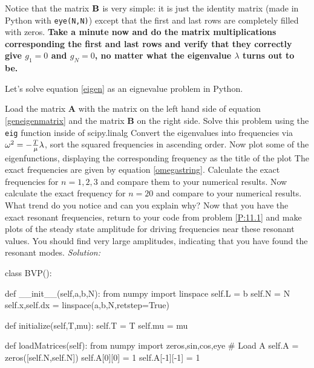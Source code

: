 \normalsize Notice that the matrix $\bf B$ is very simple: it is just
the identity matrix (made in Python with {\tt eye(N,N)}) except that
the first and last rows are completely filled with zeros. \textbf{Take a
minute now and do the matrix multiplications corresponding the first
and last rows and verify that they correctly give $g_1=0$ and
$g_N=0$, no matter what the eigenvalue $\lambda$ turns out to be.}

\begin{enumerate}
\probtwo  \label{P:11.2} Let's solve equation \eqref{eigen} as an eignevalue problem
in Python.  
\begin{enumerate}
\subprob  Load the matrix $\mathbf{A}$ with the matrix on the left hand
side of equation \eqref{geneigenmatrix} and the matrix $\mathbf{B}$ on
the right side.
\subprob  Solve this problem using the \texttt{eig} function inside of
scipy.linalg
\subprob Convert the eigenvalues into frequencies via $\omega^2 = -
{T\over \mu} \lambda$, sort the squared frequencies in ascending
order.
\subprob  Now plot some of the eigenfunctions, displaying the
corresponding frequency as the title of the plot
\subprob  The exact frequencies are given by equation
\eqref{omegastring}.  Calculate the exact frequencies for $n = 1,2,3$ and
compare them to your numerical results.  Now calculate the exact
frequency for $n=20$ and compare to your numerical results. What trend
do you notice and can you explain why?
\subprob Now that you have the exact resonant frequencies, return to
your code from problem \ref{P:11.1} and make plots of the steady state
amplitude for driving frequencies near these resonant values.  You
should find very large amplitudes, indicating that you have found the
resonant modes.
\ifsolutions
\textit{Solution:}\\
\begin{codeexample}
\begin{VerbatimOut}{\listingFile}
class BVP():

    def __init__(self,a,b,N):
        from numpy import linspace
        self.L = b
        self.N = N
        self.x,self.dx = linspace(a,b,N,retstep=True)

    def initialize(self,T,mu):
        self.T = T
        self.mu = mu

    def loadMatrices(self):
        from numpy import zeros,sin,cos,eye
        # Load A
        self.A = zeros([self.N,self.N])
        self.A[0][0] = 1
        self.A[-1][-1] = 1


\end{VerbatimOut}
\end{codeexample}
\end{enumerate}
\end{enumerate}
